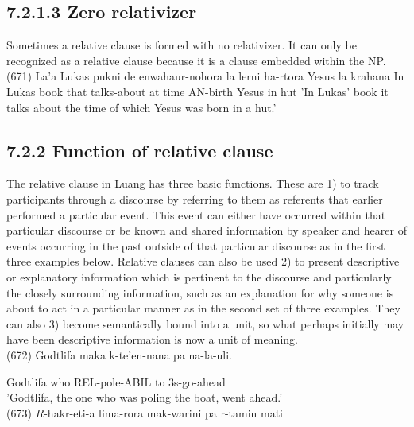 \documentclass[10pt]{article}
\begin{document}
\subsection*{7.2.1.3 Zero relativizer}
Sometimes a relative clause is formed with no relativizer. It can only be recognized as a relative clause because it is a clause embedded within the NP.\\
(671) La'a Lukas pukni de enwahaur-nohora la lerni ha-rtora Yesus la krahana In Lukas book that talks-about at time AN-birth Yesus in hut 'In Lukas' book it talks about the time of which Yesus was born in a hut.'

\subsection*{7.2.2 Function of relative clause}
The relative clause in Luang has three basic functions. These are 1) to track participants through a discourse by referring to them as referents that earlier performed a particular event. This event can either have occurred within that particular discourse or be known and shared information by speaker and hearer of events occurring in the past outside of that particular discourse as in the first three examples below. Relative clauses can also be used 2) to present descriptive or explanatory information which is pertinent to the discourse and particularly the closely surrounding information, such as an explanation for why someone is about to act in a particular manner as in the second set of three examples. They can also 3) become semantically bound into a unit, so what perhaps initially may have been descriptive information is now a unit of meaning.\\
(672) Godtlifa maka k-te'en-nana pa na-la-uli.

Godtlifa who REL-pole-ABIL to 3s-go-ahead\\
'Godtlifa, the one who was poling the boat, went ahead.'\\
(673) \(R\)-hakr-eti-a lima-rora mak-warini pa r-tamin mati
\end{document}
